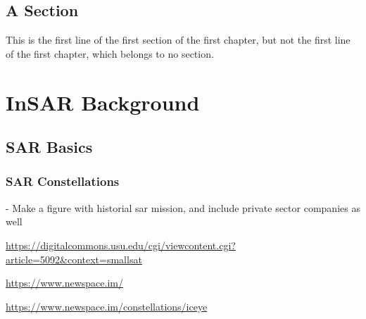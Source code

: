 \documentclass{utexasthesis}
\begin{document}
%
%
%
%
%
%
%
%



\section{A Section}

This is the first line of the first section of the first chapter, but not the first line of the first chapter, which belongs to no section.

\chapter{InSAR Background}



\section{SAR Basics}

\subsection{SAR Constellations}

- Make a figure with historial sar mission, and include private sector companies as well

\url{https://digitalcommons.usu.edu/cgi/viewcontent.cgi?article=5092&context=smallsat}

\url{https://www.newspace.im/ }

\url{https://www.newspace.im/constellations/iceye}
\end{document}
